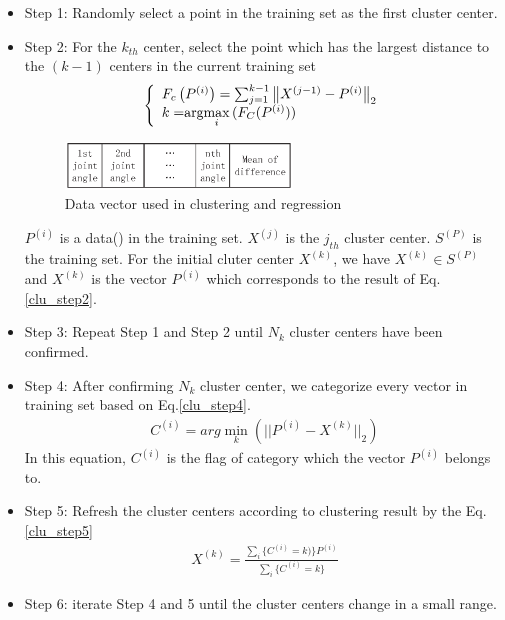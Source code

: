 \begin{itemize}
	\item Step 1: Randomly select a point in the training set as the first cluster center.
	\item Step 2: For the $k_{th}$ center, select the point which has the largest  distance to the $(k-1)$ centers in the current training set
	\begin{eqnarray}\label{clu_step2}
	\left\{
	\begin{array}{lr}
	F_{c}\left ( P^{\left (  i\right )} \right ) = \sum_{j=1}^{k-1}\left \| X^{\left ( j-1 \right )}-P^{\left (  i\right )} \right \|_{2}\\
	k = $arg$\max \limits_{i}{(F_{C}(P^{(i)}))}
	\end{array}
	\right.
	\end{eqnarray}
	\begin{figure}[H]
		\centering
		\includegraphics[height=0.5in]{fig/mainwork/data2}
		\caption{Data vector used in clustering and regression}
	\end{figure}
	$P^{(i)}$ is a data() in the training set. $X^{(j)}$ is the $j_{th}$ cluster center. $S^{(P)}$ is the  training set. For the initial cluter center $X^{(k)}$, we have $X^{(k)}\in S^{(P)}$ and $X^{(k)}$ is the vector $P^{(i)}$ which corresponds to the result of Eq.\ref{clu_step2}. 
	\item Step 3: Repeat Step 1 and Step 2 until $N_{k}$ cluster centers have been confirmed.
	\item Step 4: After confirming $N_{k}$ cluster center, we categorize every vector in training set based on Eq.\ref{clu_step4}.
	\begin{eqnarray}\label{clu_step4}
	C^{(i)} = arg\min \limits_{k}{(||P^{(i)}-X^{(k)}||_{2})}
	\end{eqnarray}
	In this equation, $C^{(i)}$ is the flag of category which the vector $P^{(i)}$ belongs to.
	\item Step 5: Refresh the cluster centers according to clustering result by the Eq.\ref{clu_step5}
	\begin{eqnarray}\label{clu_step5}
	X^{(k)}=\frac{\sum_{i}\{C^{(i)}=k)\}P^{(i)}}{\sum_{i}\{C^{(i)}=k\}}
	\end{eqnarray}
	\item Step 6: iterate Step 4 and 5 until the cluster centers change in a small range.
\end{itemize}

